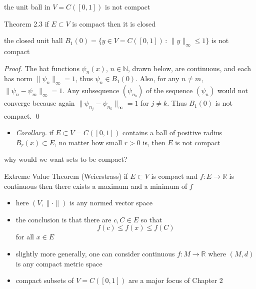 \documentclass[10pt,
               svgnames,
               hyperref={colorlinks,
                         citecolor=DeepPink4,
                         linkcolor=FireBrick,
                         urlcolor=Maroon},
               usepdftitle=false]{beamer}
\newcommand{\NN}{\mathbb{N}}
\newcommand{\RR}{\mathbb{R}}
\begin{document}
\begin{frame}{the unit ball in $V=C([0,1])$ is not compact}

\begin{block}{Theorem 2.3}
if $E\subset V$ is compact then it is closed
\end{block}

\begin{theorem}
the closed unit ball $B_1(0)=\{y\in V=C([0,1])\,:\,\|y\|_\infty \le 1\}$ is not compact
\end{theorem}

{\footnotesize
\noindent \emph{Proof.}  The hat functions $\psi_n(x)$, $n\in \NN$, drawn below, are continuous, and each has norm $\|\psi_n\|_\infty = 1$, thus $\psi_n \in B_1(0)$.  Also, for any $n\ne m$, $\|\psi_n - \psi_m\|_\infty = 1$.  Any subsequence $(\psi_{n_k})$ of the sequence $(\psi_n)$ would not converge because again $\|\psi_{n_j} - \psi_{n_k}\|_\infty = 1$ for $j\ne k$.  Thus $B_1(0)$ is not compact.  \hfill \qed
}

\vspace{20mm}

\begin{itemize}
\item \emph{Corollary.} if $E \subset V=C([0,1])$ contains a ball of positive radius $B_r(x) \subset E$, no matter how small $r>0$ is, then $E$ is not compact
\end{itemize}
\end{frame}


\begin{frame}{why would we want sets to be compact?}

\begin{block}{Extreme Value Theorem (Weierstrass)}
if $E\subset V$ is compact and $f:E\to\RR$ is continuous then there exists a maximum and a minimum of $f$
\end{block}

\begin{itemize}
\item here $(V,\|\cdot\|)$ is any normed vector space
\item the conclusion is that there are $c,C\in E$ so that
	$$f(c) \le f(x) \le f(C)$$
for all $x\in E$
\item slightly more generally, one can consider continuous $f:M\to \RR$ where $(M,d)$ is any compact metric space
\item compact subsets of $V=C([0,1])$ are a major focus of Chapter 2
\end{itemize}

\end{frame}
\end{document}
